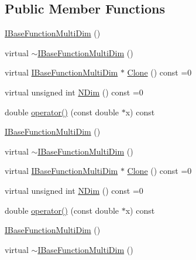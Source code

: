 \subsection*{Public Member Functions}
\begin{DoxyCompactItemize}
\item 
\mbox{\hyperlink{classROOT_1_1Math_1_1IBaseFunctionMultiDim_aef796a1f6a06fa1c4f183f001839aeac}{I\+Base\+Function\+Multi\+Dim}} ()
\item 
virtual \mbox{\hyperlink{classROOT_1_1Math_1_1IBaseFunctionMultiDim_a5133dc3b08b78281ddf471506810f1c4}{$\sim$\+I\+Base\+Function\+Multi\+Dim}} ()
\item 
virtual \mbox{\hyperlink{classROOT_1_1Math_1_1IBaseFunctionMultiDim}{I\+Base\+Function\+Multi\+Dim}} $\ast$ \mbox{\hyperlink{classROOT_1_1Math_1_1IBaseFunctionMultiDim_a57939204b1f525b43835b42e0635dd3b}{Clone}} () const =0
\item 
virtual unsigned int \mbox{\hyperlink{classROOT_1_1Math_1_1IBaseFunctionMultiDim_a16f37dc7a6d00c75ddeda0697741315d}{N\+Dim}} () const =0
\item 
double \mbox{\hyperlink{classROOT_1_1Math_1_1IBaseFunctionMultiDim_a7efd1892dc6473b3f8aaaff3cbb8bb2f}{operator()}} (const double $\ast$x) const
\item 
\mbox{\hyperlink{classROOT_1_1Math_1_1IBaseFunctionMultiDim_aef796a1f6a06fa1c4f183f001839aeac}{I\+Base\+Function\+Multi\+Dim}} ()
\item 
virtual \mbox{\hyperlink{classROOT_1_1Math_1_1IBaseFunctionMultiDim_a5133dc3b08b78281ddf471506810f1c4}{$\sim$\+I\+Base\+Function\+Multi\+Dim}} ()
\item 
virtual \mbox{\hyperlink{classROOT_1_1Math_1_1IBaseFunctionMultiDim}{I\+Base\+Function\+Multi\+Dim}} $\ast$ \mbox{\hyperlink{classROOT_1_1Math_1_1IBaseFunctionMultiDim_a57939204b1f525b43835b42e0635dd3b}{Clone}} () const =0
\item 
virtual unsigned int \mbox{\hyperlink{classROOT_1_1Math_1_1IBaseFunctionMultiDim_a16f37dc7a6d00c75ddeda0697741315d}{N\+Dim}} () const =0
\item 
double \mbox{\hyperlink{classROOT_1_1Math_1_1IBaseFunctionMultiDim_a7efd1892dc6473b3f8aaaff3cbb8bb2f}{operator()}} (const double $\ast$x) const
\item 
\mbox{\hyperlink{classROOT_1_1Math_1_1IBaseFunctionMultiDim_aef796a1f6a06fa1c4f183f001839aeac}{I\+Base\+Function\+Multi\+Dim}} ()
\item 
virtual \mbox{\hyperlink{classROOT_1_1Math_1_1IBaseFunctionMultiDim_a5133dc3b08b78281ddf471506810f1c4}{$\sim$\+I\+Base\+Function\+Multi\+Dim}} ()

\end{DoxyCompactItemize}
